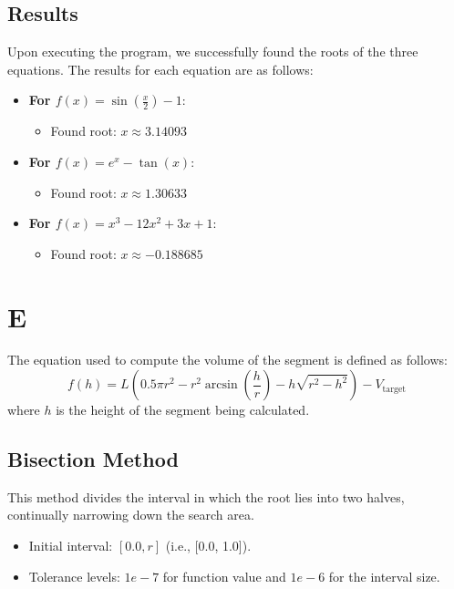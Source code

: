 \documentclass[a4paper]{article}
\begin{document}
\subsection{Results}
Upon executing the program, we successfully found the roots of the three equations. The results for each equation are as follows:
\begin{itemize}
    \item \textbf{For \( f(x) = \sin\left(\frac{x}{2}\right) - 1 \)}:
    \begin{itemize}
        \item Found root: \( x \approx 3.14093 \)
    \end{itemize}
    
    \item \textbf{For \( f(x) = e^x - \tan(x) \)}:
    \begin{itemize}
        \item Found root: \( x \approx 1.30633 \)
    \end{itemize}
    
    \item \textbf{For \( f(x) = x^3 - 12x^2 + 3x + 1 \)}:
    \begin{itemize}
        \item Found root: \( x \approx -0.188685 \)
    \end{itemize}
\end{itemize}

\section{E}
The equation used to compute the volume of the segment is defined as follows:
\[
f(h) = L \left( 0.5 \pi r^2 - r^2 \arcsin\left(\frac{h}{r}\right) - h \sqrt{r^2 - h^2} \right) - V_{\text{target}}
\]
where \( h \) is the height of the segment being calculated.

\subsection{ Bisection Method}
This method divides the interval in which the root lies into two halves, continually narrowing down the search area.
\begin{itemize}
    \item Initial interval: \( [0.0, r] \) (i.e., [0.0, 1.0]).
    \item Tolerance levels: \( 1e-7 \) for function value and \( 1e-6 \) for the interval size.
\end{itemize}
\end{document}
